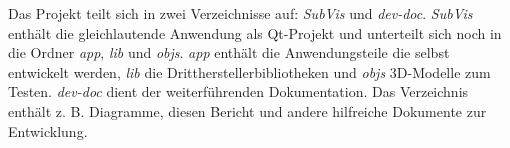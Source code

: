 Das Projekt teilt sich in zwei Verzeichnisse auf: \emph{SubVis} und \emph{dev-doc}.
\emph{SubVis} enthält die gleichlautende Anwendung als Qt-Projekt und unterteilt sich noch in die Ordner \emph{app}, \emph{lib} und \emph{objs}.
\emph{app} enthält die Anwendungsteile die selbst entwickelt werden,
\emph{lib} die Drittherstellerbibliotheken und \emph{objs} 3D-Modelle zum Testen.
\emph{dev-doc} dient der weiterführenden Dokumentation.
Das Verzeichnis enthält z. B. Diagramme, diesen Bericht und andere hilfreiche Dokumente zur Entwicklung.
































